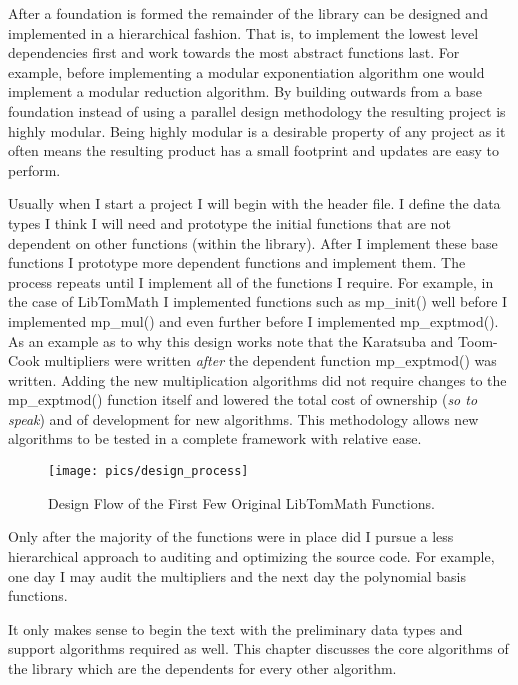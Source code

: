 \documentclass[b5paper]{book}
\begin{document}
After a foundation is formed the remainder of the library can be designed and implemented in a hierarchical fashion.  
That is, to implement the lowest level dependencies first and work towards the most abstract functions last.  For example, 
before implementing a modular exponentiation algorithm one would implement a modular reduction algorithm.
By building outwards from a base foundation instead of using a parallel design methodology the resulting project is 
highly modular.  Being highly modular is a desirable property of any project as it often means the resulting product
has a small footprint and updates are easy to perform.  

Usually when I start a project I will begin with the header file.  I define the data types I think I will need and 
prototype the initial functions that are not dependent on other functions (within the library).  After I 
implement these base functions I prototype more dependent functions and implement them.   The process repeats until
I implement all of the functions I require.  For example, in the case of LibTomMath I implemented functions such as 
mp\_init() well before I implemented mp\_mul() and even further before I implemented mp\_exptmod().  As an example as to 
why this design works note that the Karatsuba and Toom-Cook multipliers were written \textit{after} the 
dependent function mp\_exptmod() was written.  Adding the new multiplication algorithms did not require changes to the 
mp\_exptmod() function itself and lowered the total cost of ownership (\textit{so to speak}) and of development 
for new algorithms.  This methodology allows new algorithms to be tested in a complete framework with relative ease.

\begin{center}
\begin{figure}[here]
\texttt{[image: pics/design\_process]}
\caption{Design Flow of the First Few Original LibTomMath Functions.}
\label{pic:design_process}
\end{figure}
\end{center}

Only after the majority of the functions were in place did I pursue a less hierarchical approach to auditing and optimizing
the source code.  For example, one day I may audit the multipliers and the next day the polynomial basis functions.  

It only makes sense to begin the text with the preliminary data types and support algorithms required as well.  
This chapter discusses the core algorithms of the library which are the dependents for every other algorithm.
\end{document}
